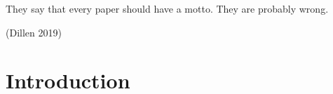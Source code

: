 
\begin{paper}
\renewcommand*{\pagemark}{}

\begin{abstract}
\lipsum[1]
\end{abstract}
\begin{motto}
They say that every paper should have a motto. They are probably wrong.

(Dillen 2019)
\end{motto}




\section{Introduction}
\lipsum[2]
\lipsum[3]



\end{paper}
